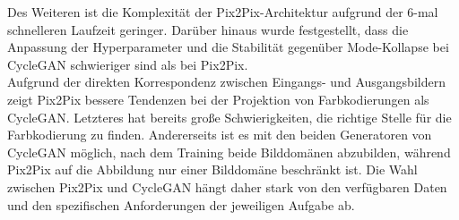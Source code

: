 Des Weiteren ist die Komplexität der Pix2Pix-Architektur aufgrund der 6-mal schnelleren Laufzeit geringer. Darüber hinaus wurde festgestellt, dass die Anpassung der Hyperparameter und die Stabilität gegenüber Mode-Kollapse bei CycleGAN schwieriger sind als bei Pix2Pix.
\\\newline
Aufgrund der direkten Korrespondenz zwischen Eingangs- und Ausgangsbildern zeigt Pix2Pix bessere Tendenzen bei der Projektion von Farbkodierungen als CycleGAN. Letzteres hat bereits große Schwierigkeiten, die richtige Stelle für die Farbkodierung zu finden. 
Andererseits ist es mit den beiden Generatoren von CycleGAN möglich, nach dem Training beide Bilddomänen abzubilden, während Pix2Pix auf die Abbildung nur einer Bilddomäne beschränkt ist. Die Wahl zwischen Pix2Pix und CycleGAN hängt daher stark von den verfügbaren Daten und den spezifischen Anforderungen der jeweiligen Aufgabe ab.